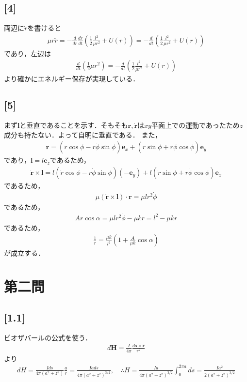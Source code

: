 \documentclass[12pt,dvipdfmx]{jsarticle}
\begin{document}
\subsection*{\large{[4]}}
両辺に$\dot{r}$を書けると
\begin{eqnarray}
  \mu\dot{r}\ddot{r} = -\frac{d}{dr}\frac{dr}{dt} \left( \frac{1}{2}\frac{l^2}{\mu r^2} +U(r) \right)  = - \frac{d}{dt}\left( \frac{1}{2}\frac{l^2}{\mu r^2} +U(r) \right) 
\end{eqnarray}
であり，左辺は
\begin{eqnarray}
  \frac{d}{dt} \left( \frac{1}{2}\mu r^2 \right) =  - \frac{d}{dt}\left( \frac{1}{2}\frac{l^2}{\mu r^2} +U(r) \right) 
\end{eqnarray}
より確かにエネルギー保存が実現している．
\subsection*{\large{[5]}}
まず$\bm{l}$と垂直であることを示す．そもそも$\bm{r},\dot{\bm{r}}$は$xy$平面上での運動であったため$z$成分も持たない．よって自明に垂直である．
また，
\begin{eqnarray}
  \bm{\dot{r}} =\left( \dot{r}\cos\phi-r\dot{\phi}\sin\phi \right)\bm{e}_x + \left( \dot{r}\sin\phi+r\dot{\phi}\cos\phi \right)\bm{e}_y
\end{eqnarray}
であり，$\bm{l}=l\bm{e}_z$であるため，
\begin{eqnarray}
  \bm{\dot{r}}\times\bm{l}= l\left( \dot{r}\cos\phi-r\dot{\phi}\sin\phi \right)(-\bm{e}_y)+ l \left( \dot{r}\sin\phi+r\dot{\phi}\cos\phi \right)\bm{e}_x
\end{eqnarray}
であるため，
\begin{eqnarray}
  \mu\left( \bm{\dot{r}}\times\bm{l} \right)\cdot\bm{r} = \mu l r^2 \dot{\phi}
\end{eqnarray}
であるため，
\begin{eqnarray}
  Ar\cos\alpha =  \mu l r^2 \dot{\phi}-\mu k r = l^2 - \mu k r
\end{eqnarray}
であるため，
\begin{eqnarray}
  \frac{1}{r} = \frac{\mu k}{l^2}\left( 1+\frac{A}{\mu k}\cos\alpha \right) 
\end{eqnarray}
が成立する．

\newpage
\section*{\Large{第二問}}
\subsection*{\large{[1.1]}}
ビオザバールの公式を使う．
\begin{eqnarray}
  d\bm{H} = \frac{I}{4\pi} \frac{d\bm{s}\times \bm{r}}{r^2}
\end{eqnarray}
より
\begin{eqnarray}
  dH = \frac{Ids}{4\pi(a^2+z^2)}\frac{a}{r} = \frac{Iads}{4\pi(a^2+z^2)^{3/2}},\quad\therefore H = \frac{Ia}{4\pi(a^2+z^2)^{3/2}}\int_0^{2\pi a}ds = \frac{Ia^2}{2(a^2+z^2)^{3/2}}
\end{eqnarray}
\end{document}
